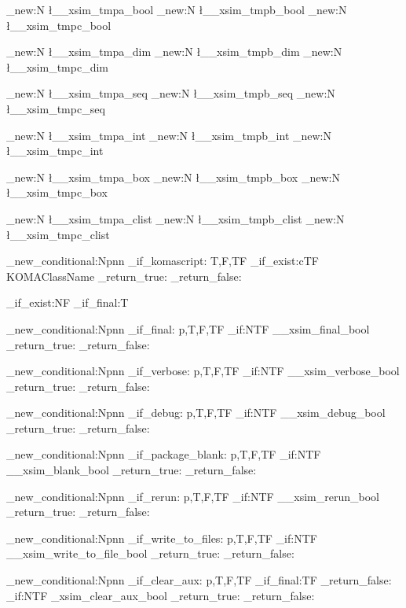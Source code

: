 \bool_new:N  \l__xsim_tmpa_bool
\bool_new:N  \l__xsim_tmpb_bool
\bool_new:N  \l__xsim_tmpc_bool

\dim_new:N   \l__xsim_tmpa_dim
\dim_new:N   \l__xsim_tmpb_dim
\dim_new:N   \l__xsim_tmpc_dim

\seq_new:N   \l__xsim_tmpa_seq
\seq_new:N   \l__xsim_tmpb_seq
\seq_new:N   \l__xsim_tmpc_seq

\int_new:N   \l__xsim_tmpa_int
\int_new:N   \l__xsim_tmpb_int
\int_new:N   \l__xsim_tmpc_int

\box_new:N   \l__xsim_tmpa_box
\box_new:N   \l__xsim_tmpb_box
\box_new:N   \l__xsim_tmpc_box

\clist_new:N \l__xsim_tmpa_clist
\clist_new:N \l__xsim_tmpb_clist
\clist_new:N \l__xsim_tmpc_clist


\prg_new_conditional:Npnn \xsim_if_komascript: {T,F,TF}
  {
    \cs_if_exist:cTF {KOMAClassName}
      { \prg_return_true: }
      { \prg_return_false: }
  }


\cs_if_exist:NF \xsim_if_final:T
  {
    \prg_new_conditional:Npnn \xsim_if_final: {p,T,F,TF}
      {
        \bool_if:NTF \g__xsim_final_bool
          { \prg_return_true: }
          { \prg_return_false: }
      }

    \prg_new_conditional:Npnn \xsim_if_verbose: {p,T,F,TF}
      {
        \bool_if:NTF \g__xsim_verbose_bool
          { \prg_return_true: }
          { \prg_return_false: }
      }
  }

\prg_new_conditional:Npnn \xsim_if_debug: {p,T,F,TF}
  {
    \bool_if:NTF \g__xsim_debug_bool
      { \prg_return_true: }
      { \prg_return_false: }
  }

\prg_new_conditional:Npnn \xsim_if_package_blank: {p,T,F,TF}
  {
    \bool_if:NTF \g__xsim_blank_bool
      { \prg_return_true: }
      { \prg_return_false: }
  }

\prg_new_conditional:Npnn \xsim_if_rerun: {p,T,F,TF}
  {
    \bool_if:NTF \g__xsim_rerun_bool
      { \prg_return_true: }
      { \prg_return_false: }
  }

\prg_new_conditional:Npnn \xsim_if_write_to_files: {p,T,F,TF}
  {
    \bool_if:NTF \g__xsim_write_to_file_bool
      { \prg_return_true: }
      { \prg_return_false: }
  }

\prg_new_conditional:Npnn \xsim_if_clear_aux: {p,T,F,TF}
  {
    \xsim_if_final:TF
      { \prg_return_false: }
      {
        \bool_if:NTF \g_xsim_clear_aux_bool
          { \prg_return_true: }
          { \prg_return_false: }
      }
  }

